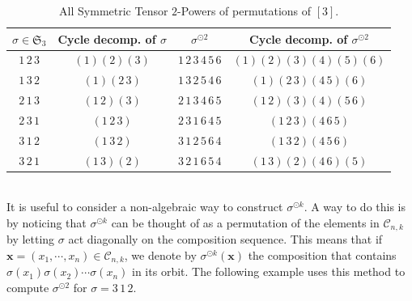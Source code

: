 \documentclass[12pt]{amsart}
\begin{document}
\begin{table}[!ht]
    \centering
    \begin{tabular}{c|c|c|c}
    \hline 
    $\sigma \in \mathfrak{S}_3$&Cycle decomp. of $\sigma$&$\sigma ^{\odot 2}$& Cycle decomp. of $\sigma ^{\odot 2}$\\
    \hline 
        $ 1\,2\,3 $&$ (1)(2)(3) $&$ 1\,2\,3\,4\,5\,6 $&$ (1)(2)(3)(4)(5)(6) $\\
$ 1\,3\,2 $&$ (1)(2\, 3) $&$ 1\,3\,2\,5\,4\,6 $&$ (1)(2\,3)(4\,5)(6) $\\
$ 2\,1\,3 $&$ (1\,2)(3) $&$ 2\,1\,3\,4\,6\,5 $&$ (1\,2)(3)(4)(5\,6) $\\
$ 2\,3\,1 $&$ (1\,2\,3) $&$ 2\,3\,1\,6\,4\,5 $&$ (1\,2\,3)(4\,6\,5) $\\
$ 3\,1\,2 $&$ (1\,3\,2) $&$ 3\,1\,2\,5\,6\,4 $&$ (1\,3\,2)(4\,5\,6) $\\
$ 3\,2\,1 $&$ (1\,3)(2) $&$ 3\,2\,1\,6\,5\,4 $&$ (1\,3)(2)(4\,6)(5) $\\
    \hline
    \end{tabular}
    \caption{All Symmetric Tensor $2$-Powers of permutations of  $[3]$.}
    \label{tab:symtenpow3}
\end{table}
\\
It is useful to consider a non-algebraic way to construct $\sigma ^{\odot k}$. A way to do this is by noticing that $\sigma ^{\odot k}$ can be thought of as a permutation of the elements in $\mathcal{C}_{n,k}$ by letting $\sigma$ act diagonally on the composition sequence. This means that if $\textbf{x} = (x_1,\cdots ,x_n) \in \mathcal{C}_{n,k}$, we denote by $\sigma ^{\odot k} (\textbf{x})$ the composition that contains $\sigma (x_1)\sigma(x_2)\cdots \sigma(x_n)$ in its orbit.  The following example uses this method to compute $\sigma ^{\odot 2}$ for $\sigma = 3\, 1\, 2$.
\end{document}
